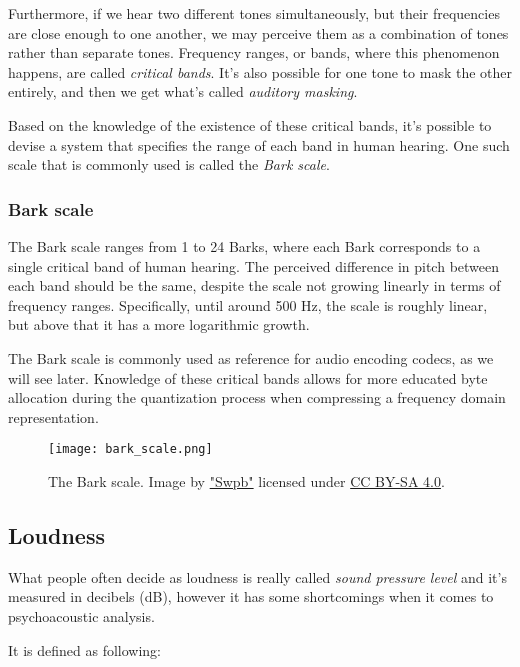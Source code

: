 Furthermore, if we hear two different tones simultaneously, but their frequencies are close enough to one another, we may perceive them as a combination of tones rather than separate tones. Frequency ranges, or bands, where this phenomenon happens, are called \emph{critical bands}. \cite{fletcher_1940} It's also possible for one tone to mask the other entirely, and then we get what's called \emph{auditory masking}. \cite{gelfand1990hearing}

Based on the knowledge of the existence of these critical bands, it's possible to devise a system that specifies the range of each band in human hearing. One such scale that is commonly used is called the \emph{Bark scale}.

\subsubsection{Bark scale}
The Bark scale ranges from 1 to 24 Barks, where each Bark corresponds to a single critical band of human hearing. \cite{fastl_2006} The perceived difference in pitch between each band should be the same, despite the scale not growing linearly in terms of frequency ranges. Specifically, until around 500 Hz, the scale is roughly linear, but above that it has a more logarithmic growth. \cite{hermes_filter}

The Bark scale is commonly used as reference for audio encoding codecs, as we will see later. Knowledge of these critical bands allows for more educated byte allocation during the quantization process when compressing a frequency domain representation.

\begin{figure}[ht]
	\caption[Bark scale]{The Bark scale. Image by \href{https://commons.wikimedia.org/wiki/User:Swpb}{"Swpb"} licensed under \href{https://creativecommons.org/licenses/by-sa/4.0/deed.en}{CC BY-SA 4.0}.}
	\centering
	\texttt{[image: bark\_scale.png]}
\end{figure}

\subsection{Loudness}
What people often decide as loudness is really called \emph{sound pressure level} and it's measured in decibels (dB), however it has some shortcomings when it comes to psychoacoustic analysis.

It is defined as following: \cite{behar_1984}

